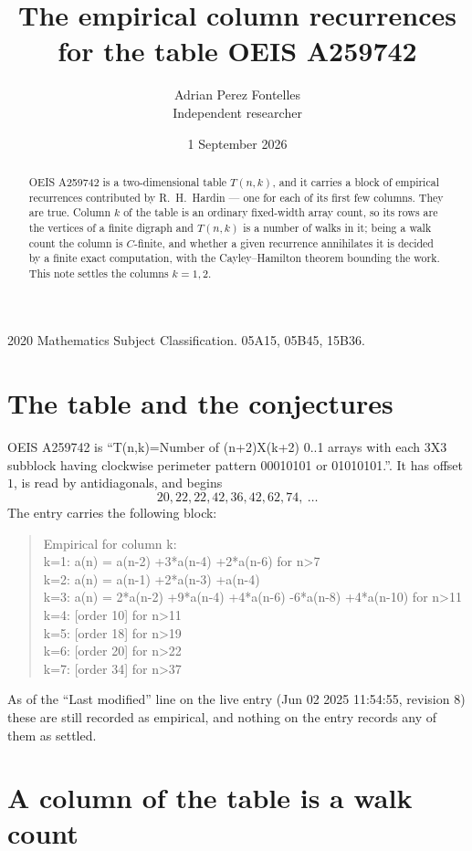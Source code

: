 \documentclass[11pt,a4paper]{article}
\title{The empirical column recurrences for the table OEIS A259742}
\author{Adrian Perez Fontelles\\ \small Independent researcher}
\date{1 September 2026}
\theoremstyle{plain}
\theoremstyle{definition}
\begin{document}
\maketitle

\begin{abstract}
OEIS A259742 is a two-dimensional table $T(n,k)$, and it carries a block of empirical
recurrences contributed by R.~H.~Hardin --- one for each of its first few columns. They are
true. Column $k$ of the table is an ordinary fixed-width array count, so its rows are the
vertices of a finite digraph and $T(n,k)$ is a number of walks in it; being a walk count the
column is $C$-finite, and whether a given recurrence annihilates it is decided by a finite
exact computation, with the Cayley--Hamilton theorem bounding the work. This note settles the columns $k=1, 2$.
\end{abstract}

\noindent\small 2020 Mathematics Subject Classification. 05A15, 05B45, 15B36.\normalsize

\section{The table and the conjectures}

OEIS A259742 is ``T(n,k)=Number of (n+2)X(k+2) 0..1 arrays with each 3X3 subblock having clockwise perimeter pattern 00010101 or 01010101.''. It has offset $1$, is
read by antidiagonals, and begins
\[
20, 22, 22, 42, 36, 42, 62, 74,\ \dots
\]
The entry carries the following block:
\begin{quote}\small
Empirical for column k:\\
k=1: a(n) = a(n-2) +3*a(n-4) +2*a(n-6) for n>7\\
k=2: a(n) = a(n-1) +2*a(n-3) +a(n-4)\\
k=3: a(n) = 2*a(n-2) +9*a(n-4) +4*a(n-6) -6*a(n-8) +4*a(n-10) for n>11\\
k=4: [order 10] for n>11\\
k=5: [order 18] for n>19\\
k=6: [order 20] for n>22\\
k=7: [order 34] for n>37\\
\end{quote}
As of the ``Last modified'' line on the live entry (Jun 02 2025 11:54:55, revision 8) these are still
recorded as empirical, and nothing on the entry records any of them as settled.

\section{A column of the table is a walk count}
\end{document}
